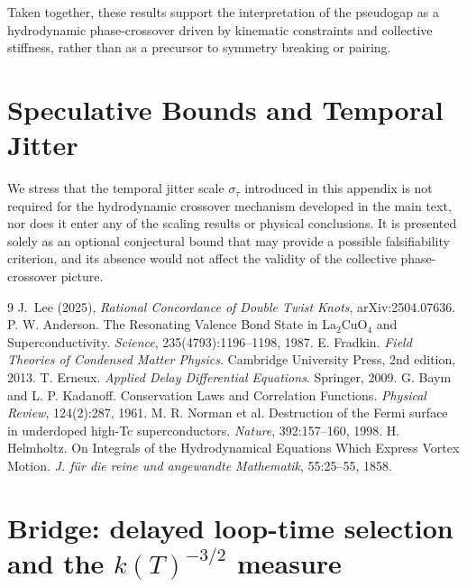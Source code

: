 \documentclass[11pt, a4paper]{article}
\begin{document}
            Taken together, these results support the interpretation of the pseudogap as a hydrodynamic phase-crossover driven by kinematic constraints and collective stiffness, rather than as a precursor to symmetry breaking or pairing.

            \appendix
        \section{Speculative Bounds and Temporal Jitter}

            We stress that the temporal jitter scale $\sigma_\tau$ introduced in this appendix is not required for the hydrodynamic crossover mechanism developed in the main text, nor does it enter any of the scaling results or physical conclusions. It is presented solely as an optional conjectural bound that may provide a possible falsifiability criterion, and its absence would not affect the validity of the collective phase-crossover picture.

            \begin{thebibliography}{9}
                 J.~Lee (2025), \emph{Rational Concordance of Double Twist Knots}, arXiv:2504.07636.
                 P. W. Anderson. The Resonating Valence Bond State in La$_2$CuO$_4$ and Superconductivity. \textit{Science}, 235(4793):1196--1198, 1987.
                 E. Fradkin. \textit{Field Theories of Condensed Matter Physics}. Cambridge University Press, 2nd edition, 2013.
                 T. Erneux. \textit{Applied Delay Differential Equations}. Springer, 2009.
                 G. Baym and L. P. Kadanoff. Conservation Laws and Correlation Functions. \textit{Physical Review}, 124(2):287, 1961.
                 M. R. Norman et al. Destruction of the Fermi surface in underdoped high-Tc superconductors. \textit{Nature}, 392:157--160, 1998.
                 H. Helmholtz. On Integrals of the Hydrodynamical Equations Which Express Vortex Motion. \textit{J. für die reine und angewandte Mathematik}, 55:25--55, 1858.
            \end{thebibliography}

\appendix


\section{Bridge: delayed loop-time selection and the $k(T)^{-3/2}$ measure}
\label{app:bridge_k_scaling}
\end{document}
